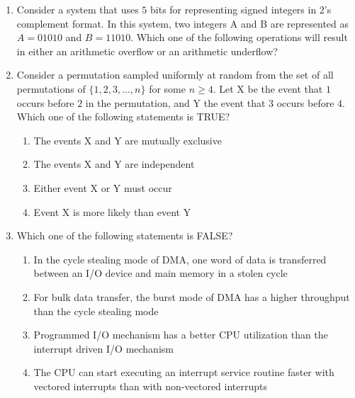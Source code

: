 \documentclass[a4paper, 11pt]{article}
\begin{document}
\begin{enumerate}
    \item Consider a system that uses $5$ bits for representing signed integers in 2's complement format. In this system, two integers A and B are represented as $A=01010$ and $B=11010$. Which one of the following operations will result in either an arithmetic overflow or an arithmetic underflow?
    \begin{enumerate}
    \end{enumerate}

    \hfill{}
    \item Consider a permutation sampled uniformly at random from the set of all permutations of $\{1, 2, 3, \dots, n\}$ for some $n \ge 4$. Let X be the event that $1$ occurs before $2$ in the permutation, and Y the event that $3$ occurs before $4$. Which one of the following statements is TRUE?

    \begin{enumerate}
        \item The events X and Y are mutually exclusive
        \item The events X and Y are independent
        \item Either event X or Y must occur
        \item Event X is more likely than event Y
    \end{enumerate}

    \hfill{}
    \item Which one of the following statements is FALSE?

    \begin{enumerate}
        \item In the cycle stealing mode of DMA, one word of data is transferred between an I/O device and main memory in a stolen cycle
        \item For bulk data transfer, the burst mode of DMA has a higher throughput than the cycle stealing mode
        \item Programmed I/O mechanism has a better CPU utilization than the interrupt driven I/O mechanism
        \item The CPU can start executing an interrupt service routine faster with vectored interrupts than with non-vectored interrupts
    \end{enumerate}
    \hfill{}


\end{enumerate}
\end{document}

